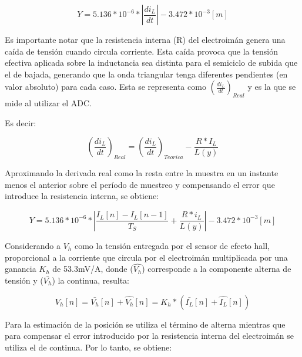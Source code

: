 \begin{equation} 
	Y = 5.136*10^{-6}*|\frac{di_L}{dt}|- 3.472*10^{-3} [m]
\end{equation}

\noindent Es importante notar que la resistencia interna (R) del electroimán genera una caída de tensión cuando circula corriente. Esta caída provoca que la tensión efectiva aplicada sobre la inductancia sea distinta para el semiciclo de subida que el de bajada, generando que la onda triangular tenga diferentes pendientes (en valor absoluto) para cada caso. Esta se representa como $(\frac{di_L}{dt})_{Real}$ y es la que se mide al utilizar el ADC.

\noindent Es decir:

\begin{equation} 
	(\frac{di_L}{dt})_{Real}=(\frac{di_L}{dt})_{Teorica}-\frac{R*I_L}{L(y)}
\end{equation}

\noindent Aproximando la derivada real como la resta entre la muestra en un instante menos el anterior sobre el período de muestreo y compensando el error que introduce la resistencia interna, se obtiene:

\begin{equation} 
	Y = 5.136*10^{-6}* |\frac{I_L[n]-I_L[n-1]}{T_S}+\frac{R*i_L}{L(y)}| - 3.472*10^{-3} [m]
\end{equation}


\noindent Considerando a $V_h$ como la tensión entregada por el sensor de efecto hall, proporcional a la corriente que circula por el electroimán multiplicada por una ganancia $K_h$ de 53.3mV/A, donde  ($\hat{V_h}$)  corresponde a la componente alterna de tensión y ($\bar{V_h}$) la continua, resulta:


\begin{equation} 
	V_h[n] = \bar{V_h}[n] + \hat{V_h}[n] = K_h * (\bar{I_L}[n] + \hat{I_L}[n])
\end{equation}

\noindent Para la estimación de la posición se utiliza el término de alterna mientras que para compensar el error introducido por la resistencia interna del electroimán se utiliza el de continua. Por lo tanto, se obtiene:





